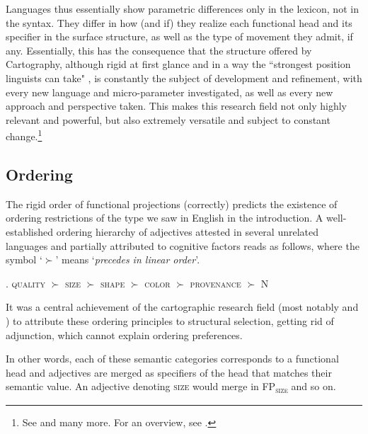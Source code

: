 Languages thus essentially show parametric differences only in the lexicon, not in the syntax. They differ in how (and if) they realize each functional head and its specifier in the surface structure, as well as the type of movement they admit, if any. Essentially, this has the consequence that the structure offered by Cartography, although rigid at first glance and in a way the ``strongest position linguists can take" \citep[9]{bortolotto:2016:RA}, is constantly the subject of development and refinement, with every new language and micro-parameter investigated, as well as every new approach and perspective taken. This makes this research field not only highly relevant and powerful, but also extremely versatile and subject to constant change.\footnote{See \citet{cinque:1993:evidence, cinque:1999:adverbs, cinque:2010:adj, cinque:2020:relcl, rizzi:1997:the, rizzi:2004:the, shlonsky:2004:form, poletto:2000:the, scott:2002:stacked, laenzlinger:2011:elements} and many more. For an overview, see \citet{cinriz:2010:carto, cinriz:2016:functional}.}

\subsection{Ordering}

The rigid order of functional projections (correctly) predicts the existence of ordering restrictions of the type we saw in English in the introduction. A well-established ordering hierarchy of adjectives attested in several unrelated languages \citep{sussex:1974:the, dixon:1982:where, hetzron:1978:on} and partially attributed to cognitive factors \citep{sproat:1987:pre, sproat:1991:the} reads as follows, where the symbol `$\succ$’ means `\textit{precedes in linear order}’.

\ex. \textsc{quality} $\succ$ \textsc{size} $\succ$ \textsc{shape} $\succ$ \textsc{color} $\succ$ \textsc{provenance} $\succ$ N \\ \null \hfill \citep{sproat:1991:the}

It was a central achievement of the cartographic research field (most notably \citealt{cinque:1993:evidence, scott:2002:stacked, laenzlinger:2005:french, panayidou:2013:in} and \citealt{cinque:2010:adj}) to attribute these ordering principles to structural selection, getting rid of adjunction, which cannot explain ordering preferences.

In other words, each of these semantic categories corresponds to a functional head and adjectives are merged as specifiers of the head that matches their semantic value. An adjective denoting \textsc{size} would merge in FP\textsubscript{\textsc{size}} and so on.

